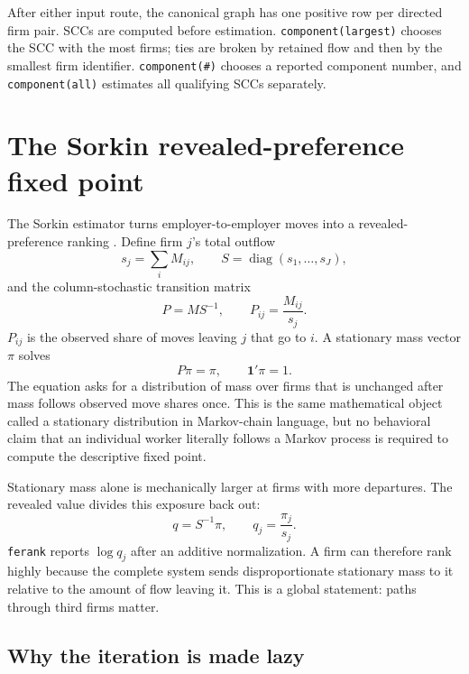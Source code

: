\documentclass[11pt]{article}
\begin{document}
After either input route, the canonical graph has one positive row per
directed firm pair. SCCs are computed before estimation.
\texttt{component(largest)} chooses the SCC with the most firms; ties are
broken by retained flow and then by the smallest firm identifier.
\texttt{component(\#)} chooses a reported component number, and
\texttt{component(all)} estimates all qualifying SCCs separately.

\section{The Sorkin revealed-preference fixed point}
\label{sec:sorkin}

The Sorkin estimator turns employer-to-employer moves into a revealed-preference
ranking \citep{sorkin2018ranking}. Define firm $j$'s total outflow
\begin{equation}
  s_j=\sum_i M_{ij}, \qquad S=\operatorname{diag}(s_1,\ldots,s_J),
\end{equation}
and the column-stochastic transition matrix
\begin{equation}
  P=MS^{-1}, \qquad P_{ij}=\frac{M_{ij}}{s_j}.
  \label{eq:transition}
\end{equation}
$P_{ij}$ is the observed share of moves leaving $j$ that go to $i$. A
stationary mass vector $\pi$ solves
\begin{equation}
  P\pi=\pi, \qquad \mathbf{1}'\pi=1.
  \label{eq:stationary}
\end{equation}
The equation asks for a distribution of mass over firms that is unchanged
after mass follows observed move shares once. This is the same mathematical
object called a stationary distribution in Markov-chain language, but no
behavioral claim that an individual worker literally follows a Markov process
is required to compute the descriptive fixed point.

Stationary mass alone is mechanically larger at firms with more departures.
The revealed value divides this exposure back out:
\begin{equation}
  q=S^{-1}\pi, \qquad q_j=\frac{\pi_j}{s_j}.
  \label{eq:q}
\end{equation}
\texttt{ferank} reports $\log q_j$ after an additive normalization. A firm can
therefore rank highly because the complete system sends disproportionate
stationary mass to it relative to the amount of flow leaving it. This is a
global statement: paths through third firms matter.

\subsection{Why the iteration is made lazy}
\end{document}

